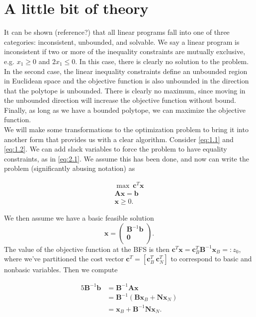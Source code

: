 \documentclass[12pt,english]{article}
\begin{document}
\section{A little bit of theory}

It can be shown (reference?) that all linear programs fall into one of three categories: inconsistent, unbounded, and solvable.  We say a linear program is inconsistent if two or more of the inequality constraints are mutually exclusive, e.g. $x_1 \geq 0$ and $2 x_1 \leq 0$.  In this case, there is clearly no solution to the problem.   In the second case, the linear inequality constraints define an unbounded region in Euclidean space and the objective function is also unbounded in the direction that the polytope is unbounded.  There is clearly no maximum, since moving in the unbounded direction will increase the objective function without bound.  Finally, as long as we have a bounded polytope, we can maximize the objective function. \\

We will make some transformations to the optimization problem to bring it into another form that provides us with a clear algorithm.  Consider \eqref{eq:1.1} and \eqref{eq:1.2}.  We can add slack variables to force the problem to have equality constraints, as in \eqref{eq:2.1}.  We assume this has been done, and now can write the problem (significantly abusing notation) as 

\begin{equation}\label{eq:4.1}
\begin{array}{l}
\max ~\mathbf{c}^T \mathbf{x} \\
\mathbf{A} \mathbf{x} = \mathbf{b} \\
\mathbf{x} \geq 0.
\end{array}
\end{equation}

We then assume we have a basic feasible solution 
$$
\mathbf{x} = 
\left(
\begin{array}{c}
\mathbf{B}^{-1}\mathbf{b}  \\
\mathbf{0} \\
\end{array}
\right).
$$
The value of the objective function at the BFS is then $\mathbf{c}^T \mathbf{x} = \mathbf{c}_B^T \mathbf{B}^{-1}\mathbf{x}_B =:z_0$, where we've partitioned the cost vector $\mathbf{c}^T = [ \mathbf{c}_B^T ~\mathbf{c}_N^T]$ to correspond to basic and nonbasic variables.  Then we compute


\begin{alignat*}{5}
\mathbf{B}^{-1} \mathbf{b}  	&= \mathbf{B}^{-1}\mathbf{A}\mathbf{x} \\
						&= \mathbf{B}^{-1}(\mathbf{B}\mathbf{x}_B + \mathbf{N}\mathbf{x}_N) \\
						&= \mathbf{x}_B + \mathbf{B}^{-1} \mathbf{N} \mathbf{x}_N.
\end{alignat*}
\end{document}
